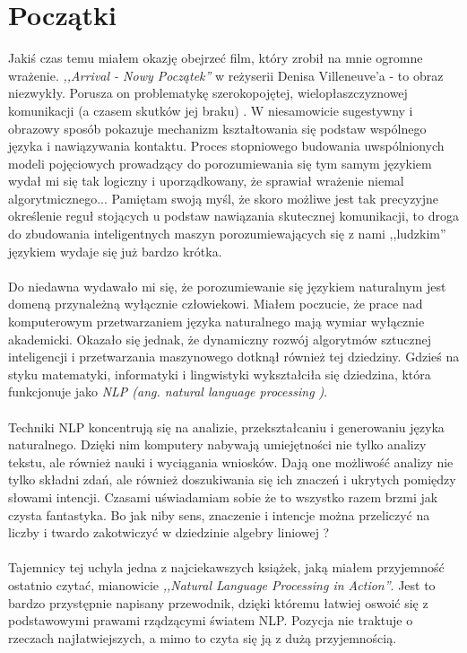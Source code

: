 \section{Początki}
Jakiś czas temu miałem okazję obejrzeć film, który zrobił na mnie ogromne wrażenie. \textit{,,Arrival - Nowy Początek''} w reżyserii Denisa Villeneuve’a - to obraz niezwykły.
Porusza on problematykę szerokopojętej, wielopłaszczyznowej komunikacji (a czasem skutków jej braku) . W niesamowicie sugestywny i obrazowy sposób pokazuje mechanizm kształtowania się podstaw wspólnego języka i nawiązywania kontaktu.
Proces stopniowego budowania uwspólnionych modeli pojęciowych prowadzący do porozumiewania się tym samym językiem wydał mi się tak logiczny i uporządkowany, że sprawiał wrażenie niemal algorytmicznego...
Pamiętam swoją myśl, że skoro możliwe jest tak precyzyjne określenie
reguł stojących u podstaw nawiązania skutecznej komunikacji, to droga do zbudowania inteligentnych maszyn porozumiewających się z nami ,,ludzkim''
językiem wydaje się już bardzo krótka.

\paragraph{}
Do niedawna wydawało mi się, że porozumiewanie się językiem naturalnym jest domeną przynależną wyłącznie człowiekowi.
Miałem poczucie, że prace nad komputerowym przetwarzaniem języka naturalnego mają wymiar wyłącznie akademicki.
Okazało się jednak, że dynamiczny rozwój algorytmów sztucznej inteligencji i
przetwarzania maszynowego dotknął również tej dziedziny. Gdzieś na styku matematyki, informatyki i lingwistyki wykształciła się
dziedzina, która funkcjonuje jako\textit{ NLP (ang.  natural language processing )}.
	
\paragraph{}
Techniki NLP koncentrują się na analizie, przekształcaniu i generowaniu języka naturalnego.
Dzięki nim komputery nabywają umiejętności nie tylko analizy tekstu, ale również nauki i wyciągania wniosków.
Dają one możliwość analizy nie tylko składni zdań, ale również doszukiwania się ich znaczeń i ukrytych pomiędzy słowami intencji.
Czasami uświadamiam sobie że to wszystko razem brzmi jak czysta fantastyka. Bo jak niby sens, znaczenie i intencje można przeliczyć na liczby i twardo
zakotwiczyć w dziedzinie algebry liniowej ?
\paragraph{}
Tajemnicy tej uchyla jedna z najciekawszych książek, jaką miałem przyjemność ostatnio czytać, mianowicie \textit{,,Natural Language Processing in Action''}.
Jest to bardzo przystępnie napisany przewodnik, dzięki któremu łatwiej oswoić się z podstawowymi prawami rządzącymi światem NLP.
Pozycja nie traktuje o rzeczach najłatwiejszych, a mimo to czyta się ją z dużą przyjemnością.
